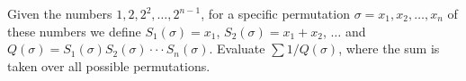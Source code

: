 Given the numbers $ 1,2,2^2, \ldots ,2^{n-1}$,  for a specific permutation $ \sigma = x_1,x_2, \ldots, x_n$ of these numbers we define $ S_1(\sigma) = x_1$,  $ S_2(\sigma)=x_1+x_2$,  $ \ldots$ and $ Q(\sigma)=S_1(\sigma)S_2(\sigma)\cdot \cdot \cdot S_n(\sigma)$. Evaluate $ \sum 1/Q(\sigma)$,  where the sum is taken over all possible permutations.